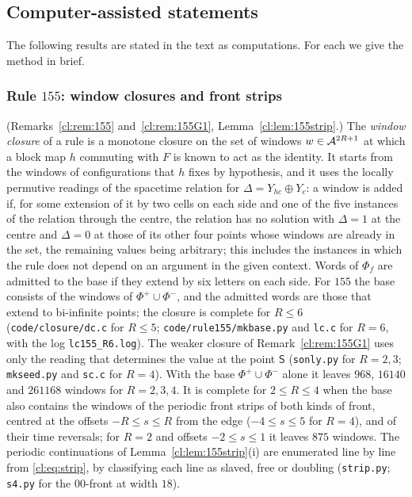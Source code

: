 \subsection{Computer-assisted statements}\label{app:stated}

The following results are stated in the text as computations. For each we give the method in brief.

\subsubsection{Rule $155$: window closures and front strips}\label{app:closure} (Remarks~\ref{cl:rem:155} and~\ref{cl:rem:155G1}, Lemma~\ref{cl:lem:155strip}.) The \emph{window closure} of a rule is a monotone closure on the set of windows $w\in\mathcal{A}^{2R+1}$ at which a block map $h$ commuting with $F$ is known to act as the identity. It starts from the windows of configurations that $h$ fixes by hypothesis, and it uses the locally permutive readings of the spacetime relation for $\Delta=Y_{hc}\oplus Y_c$: a window is added if, for some extension of it by two cells on each side and one of the five instances of the relation through the centre, the relation has no solution with $\Delta=1$ at the centre and $\Delta=0$ at those of its other four points whose windows are already in the set, the remaining values being arbitrary; this includes the instances in which the rule does not depend on an argument in the given context. Words of $\Phi_f$ are admitted to the base if they extend by six letters on each side. For $155$ the base consists of the windows of $\Phi^+\cup\Phi^-$, and the admitted words are those that extend to bi-infinite points; the closure is complete for $R\le6$ (\texttt{code/closure/dc.c} for $R\le5$; \texttt{code/rule155/mkbase.py} and \texttt{lc.c} for $R=6$, with the log \texttt{lc155\_R6.log}). The weaker closure of Remark~\ref{cl:rem:155G1} uses only the reading that determines the value at the point $\mathsf S$ (\texttt{sonly.py} for $R=2,3$; \texttt{mkseed.py} and \texttt{sc.c} for $R=4$). With the base $\Phi^+\cup\Phi^-$ alone it leaves $968$, $16140$ and $261168$ windows for $R=2,3,4$. It is complete for $2\le R\le4$ when the base also contains the windows of the periodic front strips of both kinds of front, centred at the offsets $-R\le s\le R$ from the edge ($-4\le s\le5$ for $R=4$), and of their time reversals; for $R=2$ and offsets $-2\le s\le1$ it leaves $875$ windows. The periodic continuations of Lemma~\ref{cl:lem:155strip}(i) are enumerated line by line from \eqref{cl:eq:strip}, by classifying each line as slaved, free or doubling (\texttt{strip.py}; \texttt{s4.py} for the $00$-front at width $18$).

